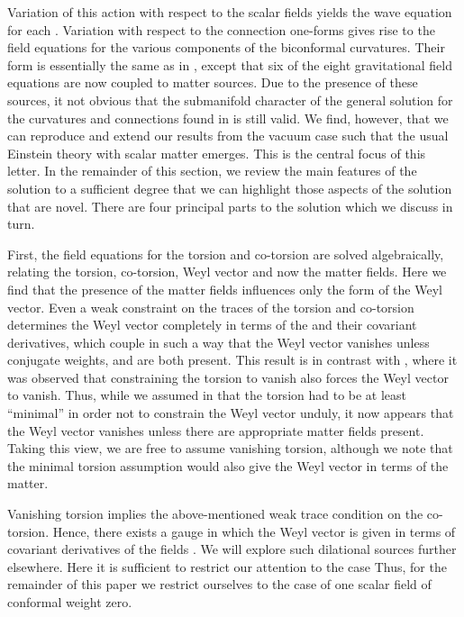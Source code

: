 \documentclass[a4paper,a4paper]{article}
\begin{document}
Variation of this action with respect to the scalar fields yields the wave
equation for each \coordHE{}. Variation with respect to the connection
one-forms gives rise to the field equations for the various components of
the biconformal curvatures. Their form is essentially the same as in \cite
{WW}, except that six of the eight gravitational field equations are now
coupled to matter sources. Due to the presence of these sources, it not
obvious that the submanifold character of the general solution for the
curvatures and connections found in \cite{WW} is still valid. We find,
however, that we can reproduce and extend our results from the vacuum case
such that the usual Einstein theory with scalar matter emerges. This is the
central focus of this letter. In the remainder of this section, we review
the main features of the solution to a sufficient degree that we can
highlight those aspects of the solution that are novel. There are four
principal parts to the solution which we discuss in turn.

\smallskip

First, the field equations for the torsion and co-torsion are solved
algebraically, relating the torsion, co-torsion, Weyl vector and now the
matter fields. Here we find that the presence of the matter fields \coordHE{} influences only the form of the Weyl vector. Even a weak constraint
on the traces of the torsion and co-torsion determines the Weyl vector
completely in terms of the \coordHE{} and their covariant derivatives,
which couple in such a way that the Weyl vector vanishes unless conjugate
weights, \coordHE{} and \coordHE{} are both present. This result is in contrast with 
\cite{WW}, where it was observed that constraining the torsion to vanish
also forces the Weyl vector to vanish. Thus, while we assumed in \cite{WW}
that the torsion had to be at least ``minimal'' in order not to constrain
the Weyl vector unduly, it now appears that the Weyl vector vanishes unless
there are appropriate matter fields present. Taking this view, we are free
to assume vanishing torsion, although we note that the minimal torsion
assumption would also give the Weyl vector in terms of the matter.

Vanishing torsion implies the above-mentioned weak trace condition on the
co-torsion. Hence, there exists a gauge in which the Weyl vector is given in
terms of covariant derivatives of the fields \coordHE{}. We will explore
such dilational sources further elsewhere. Here it is sufficient to restrict
our attention to the case \coordHE{} Thus, for the remainder of this paper we
restrict ourselves to the case of one scalar field \myHighlight{$\phi $}\coordHE{} of conformal
weight zero.
\end{document}
